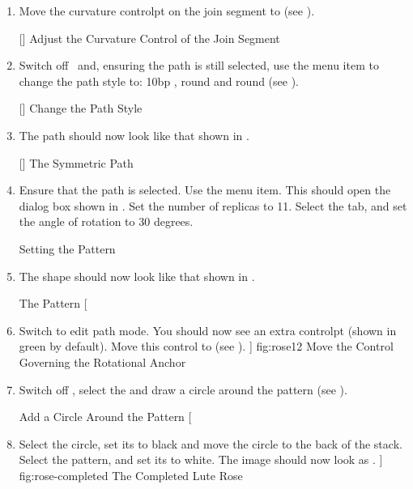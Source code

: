 \begin{enumerate}
  \item Move the curvature \gls{controlpt} on the join segment to
    (see ).

[]
{}
{Adjust the Curvature Control of the Join Segment}

  \item Switch off \editpathmode\ and, ensuring the path is still
   selected, use the 
   menu item to change the path style to: 10\gls*{bp} 
   , round  and 
   round  (see ).

[]
{}
{Change the Path Style}

  \item The path should now look like that shown in
    .

[]
{}
{The Symmetric Path}

  \item Ensure that the path is selected. Use the
    menu item. This should
   open the dialog box shown in . Set the
   number of replicas to 11. Select the 
   tab, and set the angle of rotation to 30 degrees.

{}
{Setting the Pattern}

  \item The \gls{shape} should now look like that shown in
   .

{}
{The Pattern}
[
  \item Switch to edit path mode. You should now see an extra
    \gls{controlpt} (shown in green by default). Move this control
    to  (see ).
]
{fig:rose12}
{}
{Move the Control Governing the Rotational Anchor}

  \item Switch off \editpathmode, select the
     and draw a circle
   around the pattern (see ).

{}
{Add a Circle Around the Pattern}
[
   \item Select the circle, set its 
     to black and move the circle to the \gls{back}
     of the \gls{stack}. Select the pattern, and set its
      to white. The
     image should now look as .
]
{fig:rose-completed}
{}
{The Completed Lute Rose}

\end{enumerate}

